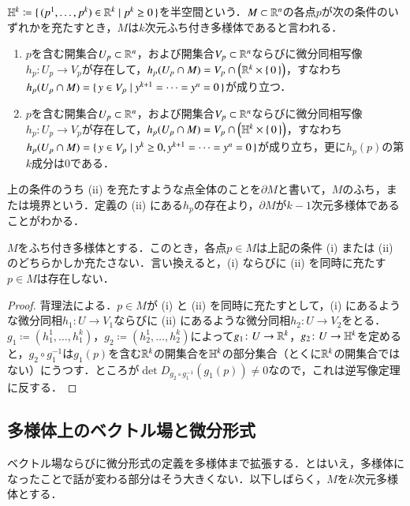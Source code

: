 \begin{defi}
$\mathbb{H}^k \coloneqq \set{(p^1, \dots, p^k) \in \mathbb{R}^k | p^k \geq 0}$を半空間という．$M \subset \mathbb{R}^n$の各点$p$が次の条件のいずれかを充たすとき，$M$は$k$次元ふち付き多様体であると言われる．
\begin{enumerate}
\item $p$を含む開集合$U_p \subset \mathbb{R}^n$，および開集合$V_p \subset \mathbb{R}^n$ならびに微分同相写像$h_p \colon U_p \to V_p$が存在して，$h_p(U_p \cap M) = V_p \cap \left(\mathbb{R}^k \times \set{0}\right)$，すなわち$h_p(U_p \cap M) = \set{y \in V_p | y^{k+1} = \dots = y^n = 0}$が成り立つ．
\item $p$を含む開集合$U_p \subset \mathbb{R}^n$，および開集合$V_p \subset \mathbb{R}^n$ならびに微分同相写像$h_p \colon U_p \to V_p$が存在して，$h_p(U_p \cap M) = V_p \cap \left(\mathbb{H}^k \times \set{0}\right)$，すなわち$h_p(U_p \cap M) = \set{y \in V_p | y^k \geq 0, y^{k+1} = \dots = y^n = 0}$が成り立ち，更に$h_p(p)$の第$k$成分は0である．
\end{enumerate}
上の条件のうち (ii) を充たすような点全体のことを$\partial M$と書いて，$M$のふち，または境界という．定義の (ii) にある$h_p$の存在より，$\partial M$が$k-1$次元多様体であることがわかる．
\end{defi}

\begin{prop}
$M$をふち付き多様体とする．このとき，各点$p \in M$は上記の条件 (i) または (ii) のどちらかしか充たさない．言い換えると，(i) ならびに (ii) を同時に充たす$p \in M$は存在しない．
\end{prop}

\begin{proof}
背理法による．$p \in M$が (i) と (ii) を同時に充たすとして，(i) にあるような微分同相$h_1 \colon U \to V_1$ならびに (ii) にあるような微分同相$h_2 \colon U \to V_2$をとる．$g_1 \coloneqq (h_1^1,\dots, h_1^k)$，$g_2 \coloneqq (h_2^1, \dots, h_2^k)$によって$g_1 \colon U \to \mathbb{R}^k$，$g_2 \colon U \to \mathbb{H}^k$を定めると，$g_2 \circ g_1^{-1}$は$g_1(p)$を含む$\mathbb{R}^k$の開集合を$\mathbb{H}^k$の部分集合（とくに$\mathbb{R}^k$の開集合ではない）にうつす．ところが$\det D_{g_2 \circ g_1^{-1}}(g_1(p)) \neq 0$なので，これは逆写像定理に反する．
\end{proof}

\subsection{多様体上のベクトル場と微分形式}

ベクトル場ならびに微分形式の定義を多様体まで拡張する．とはいえ，多様体になったことで話が変わる部分はそう大きくない．以下しばらく，$M$を$k$次元多様体とする．

